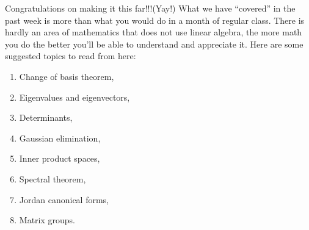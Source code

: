 Congratulations on making it this far!!!(Yay!) What we have ``covered'' in the past week is more than what you would do in a month of regular class.
There is hardly an area of mathematics that does not use linear algebra, the more math you do the better you'll be able to understand and appreciate it.
Here are some suggested topics to read from here:
\begin{multicols}{2}
  \begin{enumerate}
    \item Change of basis theorem,
    \item Eigenvalues and eigenvectors,
    \item Determinants,
    \item Gaussian elimination,
    \item Inner product spaces,
    \item Spectral theorem,
    \item Jordan canonical forms,
    \item Matrix groups.
  \end{enumerate}
\end{multicols}
